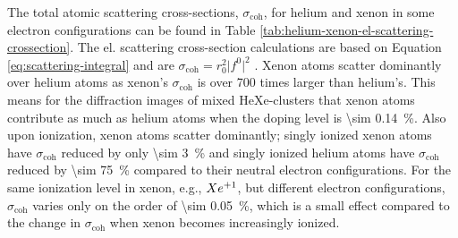 %
The total atomic scattering cross-sections, $\sigma_{\text{coh}}$, for helium and xenon in some electron configurations can be found in Table \ref{tab:helium-xenon-el-scattering-crossection}. The el. scattering cross-section calculations are based on Equation \eqref{eq:scattering-integral} and are $\sigma_{\text{coh}}=r_{0}^{2}\lvert f^{0}\rvert^{2}$ \citep{Ho-2016-PC}. Xenon atoms scatter dominantly over helium atoms as xenon's $\sigma_{\text{coh}}$ is over \num{700} times larger than helium's. This means for the diffraction images of mixed HeXe-clusters that xenon atoms contribute as much as helium atoms when the doping level is \SI{\sim 0.14}{\percent}. Also upon ionization, xenon atoms scatter dominantly; singly ionized xenon atoms have $\sigma_{\text{coh}}$ reduced by only \SI{\sim 3}{\percent} and singly ionized helium atoms have $\sigma_{\text{coh}}$ reduced by \SI{\sim 75}{\percent} compared to their neutral electron configurations. For the same ionization level in xenon, e.g., $Xe\textsuperscript{+1}$, but different electron configurations, $\sigma_{\text{coh}}$ varies only on the order of \SI{\sim 0.05}{\percent}, which is a small effect compared to the change in $\sigma_{\text{coh}}$ when xenon becomes increasingly ionized.
%
%
%
